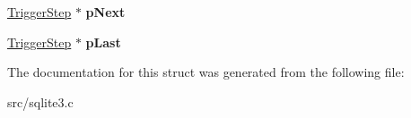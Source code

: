 \begin{DoxyCompactItemize}
\item 
\hypertarget{struct_trigger_step_a0757a0d22dbe2f7f57706014dd35759b}{\hyperlink{struct_trigger_step}{Trigger\-Step} $\ast$ {\bfseries p\-Next}}\label{struct_trigger_step_a0757a0d22dbe2f7f57706014dd35759b}

\item 
\hypertarget{struct_trigger_step_a0aae9ea7f436881c0e9e614476a69584}{\hyperlink{struct_trigger_step}{Trigger\-Step} $\ast$ {\bfseries p\-Last}}\label{struct_trigger_step_a0aae9ea7f436881c0e9e614476a69584}

\end{DoxyCompactItemize}


The documentation for this struct was generated from the following file\-:\begin{DoxyCompactItemize}
\item 
src/sqlite3.\-c\end{DoxyCompactItemize}

